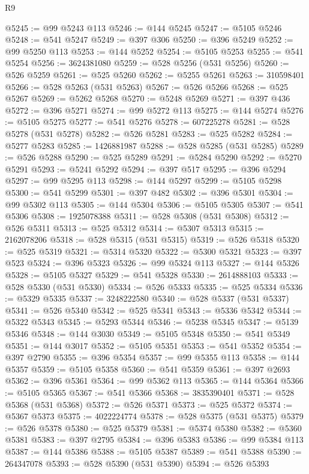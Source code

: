 \begin{lexlean}{R9}
\begin{coremodule}
@5245 := @99 @5243 @113
@5246 := @144 @5245
@5247 := @5105 @5246
@5248 := @541 @5247
@5249 := @397 @306
@5250 := @396 @5249
@5252 := @99 @5250 @113
@5253 := @144 @5252
@5254 := @5105 @5253
@5255 := @541 @5254
@5256 := 3624381080
@5259 := @528 @5256 (@531 @5256)
@5260 := @526 @5259
@5261 := @525 @5260
@5262 := @5255 @5261
@5263 := 310598401
@5266 := @528 @5263 (@531 @5263)
@5267 := @526 @5266
@5268 := @525 @5267
@5269 := @5262 @5268
@5270 := @5248 @5269
@5271 := @397 @436
@5272 := @396 @5271
@5274 := @99 @5272 @113
@5275 := @144 @5274
@5276 := @5105 @5275
@5277 := @541 @5276
@5278 := 607225278
@5281 := @528 @5278 (@531 @5278)
@5282 := @526 @5281
@5283 := @525 @5282
@5284 := @5277 @5283
@5285 := 1426881987
@5288 := @528 @5285 (@531 @5285)
@5289 := @526 @5288
@5290 := @525 @5289
@5291 := @5284 @5290
@5292 := @5270 @5291
@5293 := @5241 @5292
@5294 := @397 @517
@5295 := @396 @5294
@5297 := @99 @5295 @113
@5298 := @144 @5297
@5299 := @5105 @5298
@5300 := @541 @5299
@5301 := @397 @482
@5302 := @396 @5301
@5304 := @99 @5302 @113
@5305 := @144 @5304
@5306 := @5105 @5305
@5307 := @541 @5306
@5308 := 1925078388
@5311 := @528 @5308 (@531 @5308)
@5312 := @526 @5311
@5313 := @525 @5312
@5314 := @5307 @5313
@5315 := 2162078206
@5318 := @528 @5315 (@531 @5315)
@5319 := @526 @5318
@5320 := @525 @5319
@5321 := @5314 @5320
@5322 := @5300 @5321
@5323 := @397 @523
@5324 := @396 @5323
@5326 := @99 @5324 @113
@5327 := @144 @5326
@5328 := @5105 @5327
@5329 := @541 @5328
@5330 := 2614888103
@5333 := @528 @5330 (@531 @5330)
@5334 := @526 @5333
@5335 := @525 @5334
@5336 := @5329 @5335
@5337 := 3248222580
@5340 := @528 @5337 (@531 @5337)
@5341 := @526 @5340
@5342 := @525 @5341
@5343 := @5336 @5342
@5344 := @5322 @5343
@5345 := @5293 @5344
@5346 := @5238 @5345
@5347 := @5139 @5346
@5348 := @144 @3030
@5349 := @5105 @5348
@5350 := @541 @5349
@5351 := @144 @3017
@5352 := @5105 @5351
@5353 := @541 @5352
@5354 := @397 @2790
@5355 := @396 @5354
@5357 := @99 @5355 @113
@5358 := @144 @5357
@5359 := @5105 @5358
@5360 := @541 @5359
@5361 := @397 @2693
@5362 := @396 @5361
@5364 := @99 @5362 @113
@5365 := @144 @5364
@5366 := @5105 @5365
@5367 := @541 @5366
@5368 := 3835390401
@5371 := @528 @5368 (@531 @5368)
@5372 := @526 @5371
@5373 := @525 @5372
@5374 := @5367 @5373
@5375 := 4022224774
@5378 := @528 @5375 (@531 @5375)
@5379 := @526 @5378
@5380 := @525 @5379
@5381 := @5374 @5380
@5382 := @5360 @5381
@5383 := @397 @2795
@5384 := @396 @5383
@5386 := @99 @5384 @113
@5387 := @144 @5386
@5388 := @5105 @5387
@5389 := @541 @5388
@5390 := 264347078
@5393 := @528 @5390 (@531 @5390)
@5394 := @526 @5393

\end{coremodule}
\end{lexlean}
